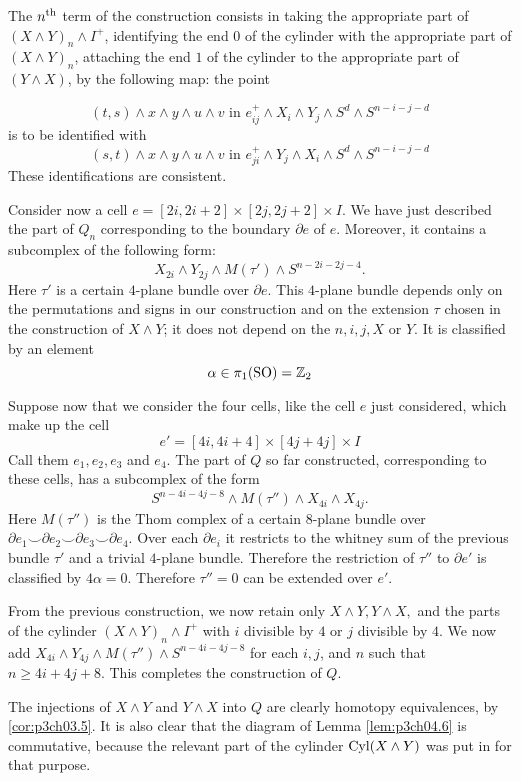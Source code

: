 \documentclass[../main]{subfiles}
\begin{document}
The $n^{\text{th}}$ term of the construction consists in taking the appropriate part of $(X\wedge Y)_n \wedge I^+$, identifying the end $0$ of the cylinder with the appropriate part of $(X\wedge Y)_n$, attaching the end $1$ of the cylinder to the appropriate part of $(Y\wedge X)$, by the following map: the point

\[(t,s)\wedge x\wedge y\wedge u\wedge v\text{  in  }e_{ij}^+ \wedge X_i\wedge Y_j \wedge S^d \wedge S^{n-i-j-d}\]
is to be identified with 
\[(s,t)\wedge x\wedge y\wedge u\wedge v\text{  in  }e_{ji}^+ \wedge Y_j\wedge X_i \wedge S^d \wedge S^{n-i-j-d}\]
These identifications are consistent.

Consider now a cell $e=[2i,2i+2]\times [2j,2j+2]\times I$. We have just described the part of $Q_n$ corresponding to the boundary $\partial e$ of $e$. Moreover, it contains a subcomplex of the following form:
\[X_{2i}\wedge Y_{2j}\wedge M(\tau') \wedge S^{n-2i-2j-4}.\]
Here $\tau'$ is a certain $4$-plane bundle over $\partial e$. This $4$-plane bundle depends only on the permutations and signs in our construction and on the extension $\tau$ chosen in the construction of $X\wedge Y$; it does not depend on the $n,i,j,X$ or $Y$. It is classified by an element \[\alpha\in \pi_1(\mathrm{SO}) = \mathbb{Z}_2\]

Suppose now that we consider the four cells, like the cell $e$ just considered, which make up the cell \[e'=[4i,4i+4]\times [4j+4j]\times I \]
Call them $e_1,e_2,e_3$ and $e_4$. The part of $Q$ so far constructed, corresponding to these cells, has a subcomplex of the form 
\[S^{n-4i-4j-8}\wedge M(\tau'')\wedge X_{4i}\wedge X_{4j} .\]
Here $M(\tau'')$ is the Thom complex of a certain $8$-plane bundle over \newline $\partial e_1\smile \partial e_2\smile \partial e_3\smile \partial e_4$. Over each $\partial e_i$ it restricts to the whitney sum of the previous bundle $\tau'$ and a trivial $4$-plane bundle. Therefore the restriction of $\tau''$ to $\partial e'$ is classified by $4\alpha=0$. Therefore $\tau''=0$ can be extended over $e'$.

From the previous construction, we now retain only $X\wedge Y, Y\wedge X,$ and the parts of the cylinder $(X\wedge Y)_n \wedge I^+$ with $i$ divisible by $4$ or $j$ divisible by $4$. We now add $X_{4i}\wedge Y_{4j} \wedge M(\tau'') \wedge S^{n-4i-4j-8}$ for each $i,j$, and $n$ such that $n\geq 4i+4j+8$. This completes the construction of $Q$.

The injections of $X\wedge Y$ and $Y\wedge X$ into $Q$ are clearly homotopy equivalences, by \ref{cor:p3ch03.5}. It is also clear that the diagram of Lemma \ref{lem:p3ch04.6} is commutative, because the relevant part of the cylinder $\mathrm{Cyl}(X\wedge Y)$ was put in for that purpose.
\end{document}
